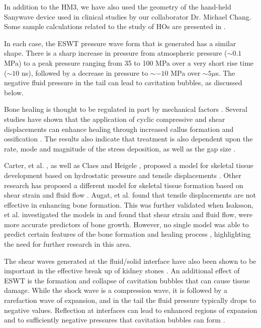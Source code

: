 \documentclass{article}
\begin{document}
In addition to the HM3, we have also used the geometry of the
hand-held Sanywave device used in clinical studies
by our collaborator Dr. Michael Chang.
Some sample calculations related to the study of HOs are presented in
.

In each case, the ESWT pressure wave form
that is generated has a similar shape. There is a sharp increase
in pressure from atmospheric pressure ($\sim0.1$MPa)
to a peak  pressure ranging from 35 to 100
MPa over a very short rise time ($\sim10$ ns), 
followed by a decrease in pressure to $\sim-10$
MPa over $\sim5 \mu$s. The negative fluid pressure in the tail can lead to
cavitation bubbles, as discussed below.
  

Bone healing is thought to be regulated in part by mechanical factors \cite{morgan2008, huang2010, turner1998, robling2002,huang2010,goodship1985,turner1998}.  Several studies have shown that the application of cyclic compressive and shear displacements can enhance healing through increased callus formation and ossification \cite{morgan2008, robling2002, roblingcyclic2002, saxon2005,park1998,weinbaum1994}.  The results also indicate that treatment is also dependent upon the rate, mode and magnitude of the stress deposition\cite{morgan2008}, as well as the gap size \cite{claes1995}. 

Carter, et al. \cite{carter1998}, as well as Claes and Heigele \cite{claes1999}, proposed a model for skeletal tissue development based on hydrostatic pressure and tensile displacements \cite{claes1999}.  Other research has proposed a different model for skeletal tissue formation based on shear strain and fluid flow \cite{prendergast1997,lacroix2002}.  Augat, et al. \cite{augat2001} found that tensile displacements are not effective in enhancing bone formation.  This was further validated when Isaksson, et al. \cite{isaksson2006} investigated the models in \cite{claes1999, carter1998, prendergast1997, lacroix2002} and found that shear strain and fluid flow, were more accurate predictors of bone growth. However, no single model was able to predict certain features of the bone formation and healing process \cite{morgan2008}, highlighting the need for further research in this area. 

 
The shear waves generated at the fluid/solid interface have also been shown to be important in 
the effective break up of kidney stones \cite{bailey_oleg,freund}.  An additional effect of ESWT is the
formation and collapse of cavitation bubbles that can cause tissue
damage.  While the shock wave is a compression wave, it is followed
by a rarefaction wave of expansion, and in the tail the fluid
pressure typically drops to negative values.  Reflection at interfaces
can lead to enhanced regions of expansion and to sufficiently
negative pressures that cavitation bubbles can form \cite{matula_direct, tanguay, coleman}.
\end{document}
